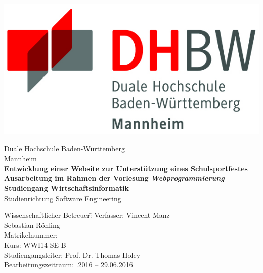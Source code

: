 \begin{titlepage}
	\begin{minipage}{\textwidth}
		\vspace{-2cm}
		\noindent \hfill   \includegraphics{img/logo.jpg}
	\end{minipage}
	\vspace{1em}
	\sffamily
	\begin{center}
		\textsf{\large{}Duale Hochschule Baden-W\"urttemberg\\[1.5mm] Mannheim}\\[2em]
		\textsf{\textbf{\Large{}Entwicklung einer Website zur Unterstützung eines Schulsportfestes}}\\[3mm]
		\textsf{\textbf{Ausarbeitung im Rahmen der Vorlesung \textit{Webprogrammierung}}} \\[1.5cm]
		\textsf{\textbf{\Large{}Studiengang Wirtschaftsinformatik}\\[3mm] \textsf{Studienrichtung Software Engineering}}
		
		\vspace{3em}
		\vfill
		
		\begin{minipage}{\textwidth}
			
			\begin{tabbing}
				Wissenschaftlicher Betreuer:\hspace{0.85cm}\=\kill
				Verfasser: \>Vincent Manz \\[1mm]
				\>Sebastian Röhling \\[1mm]
				Matrikelnummer:  \\[1mm]
				Kurs: \> WWI14 SE B \\[1mm]
				Studiengangsleiter: \> Prof. Dr. Thomas Holey  \\[1mm]
				Bearbeitungszeitraum: .2016 -- 29.06.2016
			\end{tabbing}
		\end{minipage}
		
	\end{center}
	
\end{titlepage}